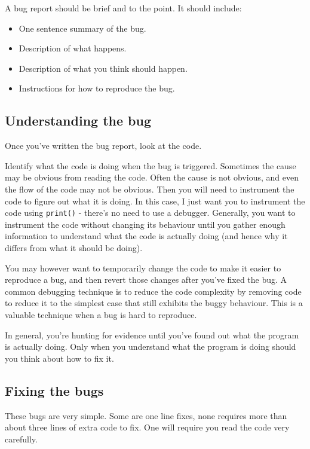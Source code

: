 \documentclass{article}
\begin{document}
A bug report should be brief and to the point.  It should include:
\begin{itemize}
\item One sentence summary of the bug.
\item Description of what happens.
\item Description of what you think should happen.
\item Instructions for how to reproduce the bug.
\end{itemize}

\subsection*{Understanding the bug}

Once you've written the bug report, look at the code.

Identify what the code is doing when the bug is triggered.  Sometimes
the cause may be obvious from reading the code.  Often the cause is
not obvious, and even the flow of the code may not be obvious.  Then
you will need to instrument the code to figure out what it is doing.
In this case, I just want you to instrument the code using
\texttt{print()} - there's no need to use a debugger.  Generally, you
want to instrument the code without changing its behaviour until you
gather enough information to understand what the code is actually
doing (and hence why it differs from what it should be doing).  

You may however want to temporarily change the code to make it easier
to reproduce a bug, and then revert those changes after you've fixed
the bug. A common debugging technique is to reduce the code complexity
by removing code to reduce it to the simplest case that still exhibits
the buggy behaviour.  This is a valuable technique when a bug is hard
to reproduce.

In general, you're hunting for evidence until you've found out what
the program is actually doing.  Only when you understand what the
program is doing should you think about how to fix it.

\subsection*{Fixing the bugs}

These bugs are very simple.  Some are one line fixes, none requires
more than about three lines of extra code to fix.  One will require you read the code very carefully.
\end{document}
